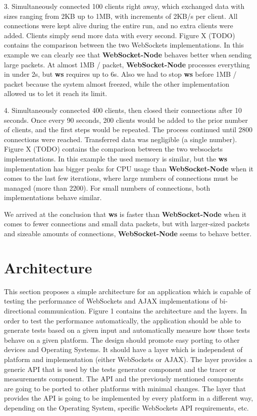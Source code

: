 \documentclass[conference]{IEEEtran}
\begin{document}
3. Simultaneously connected 100 clients right away, which exchanged data with
sizes ranging from 2KB up to 1MB, with increments of 2KB/s per client. All
connections were kept alive during the entire run, and no extra clients were
added. Clients simply send more data with every second. Figure X (TODO)
contains the comparison between the two WebSockets implementations. In this
example we can clearly see that \textbf{WebSocket-Node} behaves better when
sending large packets. At almost 1MB / packet, \textbf{WebSocket-Node}
processes everything in under 2s, but \textbf{ws} requires up to 6s. Also
we had to stop \textbf{ws} before 1MB / packet because the system almost freezed,
while the other implementation allowed us to let it reach its limit.

4. Simultaneously connected 400 clients, then closed their connections after 10
seconds. Once every 90 seconds, 200 clients would be added to the prior number
of clients, and the first steps would be repeated.
The process continued until 2800 connections
were reached. Transferred data was negligible (a single number). Figure X (TODO)
contains the comparison between the two websockets implementations. In this
example the used memory is similar, but the \textbf{ws} implementation has
bigger peaks for CPU usage than \textbf{WebSocket-Node} when it comes to the
last few iterations, where large numbers of connections must be managed
(more than 2200). For small numbers of connections, both implementations behave
similar.

We arrived at the conclusion that \textbf{ws} is faster than
\textbf{WebSocket-Node} when it comes to fewer connections and small data
packets, but with larger-sized packets and sizeable amounts of connections,
\textbf{WebSocket-Node} seems to behave better.


\section{Architecture}
This section proposes a simple architecture for an application which is capable
of testing the performance of WebSockets and AJAX implementations of bi-directional
communication. Figure 1 contains the architecture and the layers. In order to
test the performance automatically, the application should be able to generate
tests based on a given input and automatically measure how those tests behave
on a given platform. The design should promote easy porting to other devices
and Operating Systems. It should have a layer which is independent of 
platform and implementation (either WebSockets or AJAX). The layer provides a generic
API that is used by the tests generator component and the tracer or measurements
component. The API and the previously mentioned components are going to be ported
to other platforms with minimal changes. The layer that provides the API is going
to be implemented by every platform in a different way, depending on the
Operating System, specific WebSockets API requirements, etc.

{}

\end{document}
